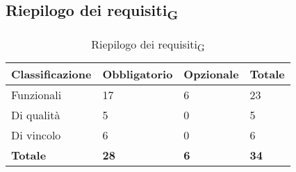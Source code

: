 \subsection{Riepilogo dei requisiti\textsubscript{G}}

\begin{table}[h]
	\centering
	\setlength\extrarowheight{5pt}
	\begin{tabular}{| p{} | p{} | p{} | p{} |} 
		\hline
		\rowcolor{white}
		\textbf{Classificazione} & \textbf{Obbligatorio} & \textbf{Opzionale} & \textbf{Totale} \\
		\hline
		Funzionali & 17 & 6 & 23\\
		\hline
		Di qualità & 5 & 0 & 5\\
		\hline
		Di vincolo & 6 & 0 & 6\\
		\hline
		\textbf{Totale} & \textbf{28} &\textbf {6} &  \textbf{34}\\
		\hline
	\end{tabular}
	\caption{Riepilogo dei requisiti\textsubscript{G}}
\end{table}
